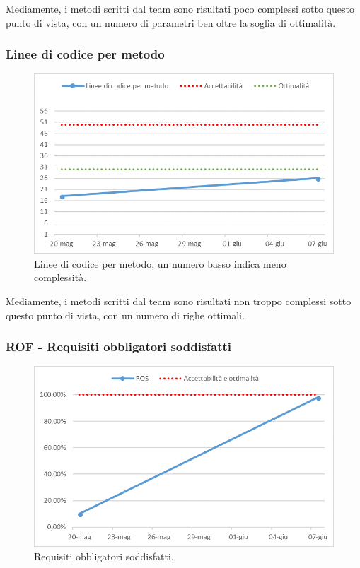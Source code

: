 Mediamente, i metodi scritti dal team sono risultati poco complessi sotto questo punto di vista, con un numero di parametri ben oltre la soglia di ottimalità.

\subsubsection{Linee di codice per metodo}

\begin{figure}[h!]
	\centering
	\includegraphics[scale=0.75]{img/Grafici/Linee_metodo.png}
	\caption{Linee di codice per metodo, un numero basso indica meno complessità.}
\end{figure}

Mediamente, i metodi scritti dal team sono risultati non troppo complessi sotto questo punto di vista, con un numero di righe ottimali.

\newpage

\subsubsection{ROF - Requisiti obbligatori soddisfatti}

\begin{figure}[h!]
	\centering
	\includegraphics[scale=0.75]{img/Grafici/ROS.png}
	\caption{Requisiti obbligatori soddisfatti.}
\end{figure}

